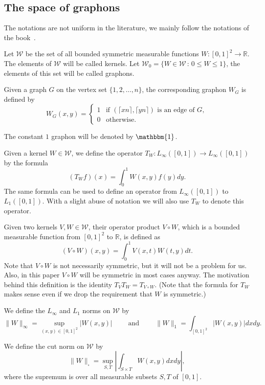 \documentclass[11pt,a4paper]{article}
\theoremstyle{plain}
\theoremstyle{definition}
\begin{document}
\subsection{The space of graphons}

The notations are not uniform in the literature, we mainly follow the notations of the book~\cite{lovasz2012large}.

Let $\mathcal{W}$ be the set of all bounded symmetric measurable functions $W:[0,1]^2\to\mathbb{R}$. The elements of $\mathcal{W}$ will be called kernels. Let $\mathcal{W}_0=\{W\in\mathcal{W}\,:\, 0\le W\le 1\}$, the elements of this set will be called graphons.

Given a graph $G$ on the vertex set $\{1,2,\dots,n\}$, the corresponding graphon $W_G$ is defined by
\[W_G(x,y)=\begin{cases}
1&\text{if $(\lceil xn \rceil,\lceil yn \rceil)$ is an edge of $G$},\\
0&\text{otherwise.}
\end{cases}\]

The constant $1$ graphon will be denoted by $\mathbbm{1}$.

Given a kernel $W\in \mathcal{W}$, we define the operator $T_W:L_{\infty}([0,1])\to L_{\infty}([0,1])$ by the formula
\[(T_Wf)(x)=\int_0^1 W(x,y)f(y)dy.\]
The same formula can be used to define an operator from $L_{\infty}([0,1])$ to $ L_{1}([0,1])$. With a slight abuse of notation we will also use $T_W$ to denote this operator.

Given two kernels $V,W\in \mathcal{W}$, their operator product $V\circ W$, which is a bounded measurable function from $[0,1]^2$ to $\mathbb{R}$, is defined as
\[(V\circ W)(x,y)=\int_0^1 V(x,t)W(t,y)dt.\]
Note that $V\circ W$ is not necessarily symmetric, but it will not be a problem for us. Also, in this paper $V\circ W$ will be symmetric in most cases anyway. The motivation behind this definition is the identity $T_VT_W=T_{V\circ W}$. (Note that the formula for $T_W$ makes sense even if we drop the requirement that $W$ is symmetric.)


We define the $L_\infty$ and $L_1$ norms on $\mathcal{W}$ by
\[\|W\|_\infty=\sup_{(x,y)\in [0,1]^2} |W(x,y)|\qquad\text{ and }\qquad\|W\|_1=\int_{[0,1]^2} |W(x,y)| dxdy.\]




We define the cut norm on $\mathcal{W}$ by
\[\|W\|_\square=\sup_{S,T} \left|\int_{S\times T} W(x,y) dxdy\right|,\]
where the supremum is over all measurable subsets $S,T$ of $[0,1]$. 
\end{document}
